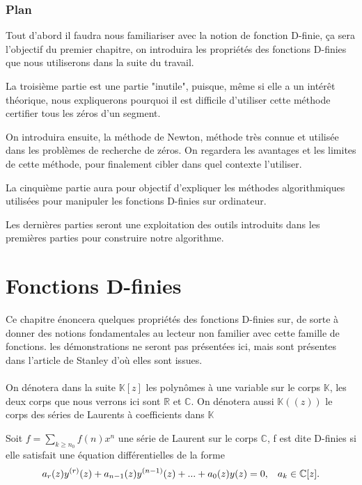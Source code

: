 \documentclass[a4paper,10.5pt]{article}
\begin{document}
	\subsubsection{Plan}
	
	Tout d'abord il faudra nous familiariser avec la notion de fonction D-finie, ça sera l'objectif du premier chapitre, on introduira les propriétés des fonctions D-finies que nous utiliserons dans la suite du travail.
	
	La troisième partie est une partie "inutile", puisque, même si elle a un intérêt théorique, nous expliquerons pourquoi il est difficile d'utiliser cette méthode certifier tous les zéros d'un segment.
	
	On introduira ensuite, la méthode de Newton, méthode très connue et utilisée dans les problèmes de recherche de zéros. On regardera les avantages et les limites de cette méthode, pour finalement cibler dans quel contexte l'utiliser.
	
	La cinquième partie aura pour objectif d'expliquer les méthodes algorithmiques utilisées pour manipuler les fonctions D-finies sur ordinateur.
	
	Les dernières parties seront une exploitation des outils introduits dans les premières parties pour construire notre algorithme. 
	
	
	\section{Fonctions D-finies}
	Ce chapitre énoncera quelques propriétés des fonctions D-finies sur, de sorte à donner des notions fondamentales au lecteur non familier avec cette famille de fonctions. les démonstrations ne seront pas présentées ici, mais sont présentes dans l'article de Stanley \cite{stanley1980differentiably} d'où elles sont issues.\\
	\\
	On dénotera dans la suite $\mathbb{K}[z]$ les polynômes à une variable sur le corps $\mathbb{K}$, les deux corps que nous verrons ici sont $\mathbb{R}$ et $\mathbb{C}$. On dénotera aussi $\mathbb{K}((z))$ le corps des séries de Laurents à coefficients dans $\mathbb{K}$
	
	\begin{definition}
		Soit $f=\sum_{k\geq n_0}f(n)x^n$ une série de Laurent sur le corps $\mathbb{C}$, f est dite  D-finies si elle satisfait une équation différentielles de la forme
		\begin{equation}
		a_{r}(z)y^{(r)}(z)+a_{n-1}(z)y^{(n-1)}(z)+...+a_{0}(z)y(z)=0, \hspace{3mm} a_{k}\in \mathbb{C}[z].
		\end{equation}
	\end{definition}
	
\end{document}
